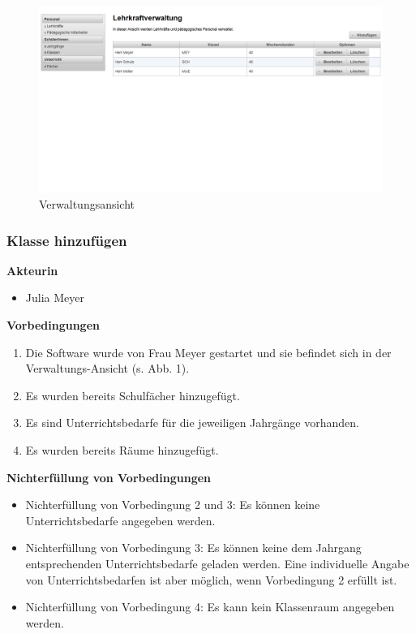 \documentclass[fontsize=12pt,paper=a4,twoside]{scrartcl}
\begin{document}
\begin{figure}[H]
\caption{Verwaltungsansicht}
\includegraphics[width=\textwidth]{verwaltungsansicht.png}
\end{figure}
\vspace{5pt}



\subsubsection{Klasse hinzufügen}
\label{subsubsec:KlasseHinzufuegen}
\textbf{Akteurin}
\begin{itemize}
\item Julia Meyer
\end{itemize}
\vspace{5pt}


\textbf{Vorbedingungen}
\begin{enumerate}
\item Die Software wurde von Frau Meyer gestartet und sie befindet sich in der Verwaltungs-Ansicht (s. Abb. 1).
\item Es wurden bereits Schulfächer hinzugefügt.
\item Es sind Unterrichtsbedarfe für die jeweiligen Jahrgänge vorhanden.
\item Es wurden bereits Räume hinzugefügt.
\end{enumerate}
\vspace{5pt}


\textbf{Nichterfüllung von Vorbedingungen}
\begin{itemize}
\item Nichterfüllung von Vorbedingung 2 und 3: Es können keine Unterrichtsbedarfe angegeben werden.
\item Nichterfüllung von Vorbedingung 3: Es können keine dem Jahrgang entsprechenden Unterrichtsbedarfe geladen werden. Eine individuelle Angabe von Unterrichtsbedarfen ist aber möglich, wenn Vorbedingung 2 erfüllt ist.
\item Nichterfüllung von Vorbedingung 4: Es kann kein Klassenraum angegeben werden.
\end{itemize}
\vspace{5pt}
\end{document}
